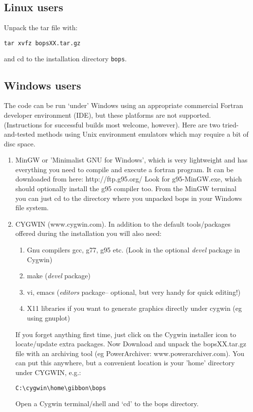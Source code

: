 \documentclass[11pt]{article}
\begin{document}
\subsection*{Linux users}
Unpack the tar file with:
\begin{verbatim}
tar xvfz bopsXX.tar.gz
\end{verbatim}
and cd to the installation directory \texttt{bops}.

\subsection*{Windows users}

The code can be run `under' Windows using an appropriate commercial Fortran developer environment (IDE), but these
platforms are not supported.  (Instructions for successful builds most welcome, however).
Here are two tried-and-tested methods using Unix environment emulators which may require a bit of disc space.

\begin{enumerate}
\item MinGW or 'Minimalist GNU for Windows', which is very lightweight and has everything you
need to compile and execute a fortran program.  It can be downloaded from here: http://ftp.g95.org/   Look for g95-MinGW.exe, which should optionally install the g95 compiler too.  From the MinGW terminal you can just cd to the directory where you unpacked bops in your Windows file system. 

\item CYGWIN (www.cygwin.com).   
In addition to the default tools/packages offered during the installation you will also need:
\begin{enumerate}
	\item Gnu compilers gcc, g77, g95 etc. (Look in the optional {\it devel} package in Cygwin)
	\item make ({\it devel} package)
	\item vi, emacs ({\it editors} package-- optional, but very handy for quick editing!)
	\item X11 libraries if you want to generate graphics directly under cygwin (eg using gnuplot)
\end{enumerate}
If you forget anything first time, just click on the Cygwin installer icon to locate/update extra packages. Now Download and unpack the bopsXX.tar.gz file with an archiving tool (eg PowerArchiver: www.powerarchiver.com).
You can put this anywhere, but a convenient location is your 'home' directory under CYGWIN, e.g.:

\begin{verbatim}
C:\cygwin\home\gibbon\bops
\end{verbatim}

Open a Cygwin terminal/shell and `cd' to the bops directory.

\end{enumerate}
\end{document}
